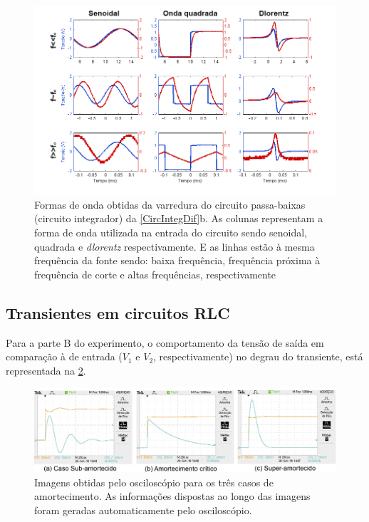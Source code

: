 \documentclass[11pt,a4paper]{article}
\begin{document}
    
        \begin{figure}[!htb]
        \centering
        \includegraphics[scale=0.8]{PassaBaixaVarredura.png}
        \caption{Formas de onda obtidas da varredura do circuito passa-baixas (circuito integrador) da \cref{CircIntegDif}b. As colunas representam a forma de onda utilizada na entrada do circuito sendo senoidal, quadrada e \textit{dlorentz} respectivamente. E as linhas estão à mesma frequência da fonte sendo: baixa frequência, frequência próxima à frequência de corte e altas frequências, respectivamente}
        \label{PassaBaixaVarredura}
        \end{figure}
        
    \newpage
    \subsection{Transientes em circuitos RLC}
    Para a parte B do experimento, o comportamento da tensão de saída em comparação à de entrada ($V_1$ e $V_2$, respectivamente) no degrau do transiente, está representada na \cref{TransOscilo}.
    
        \begin{figure}[!htb]
        \centering
        \includegraphics[scale=0.55]{TransienteOsciloscopio.png}
        \caption{Imagens obtidas pelo osciloscópio para os três casos de amortecimento. As informações dispostas ao longo das imagens foram geradas automaticamente pelo osciloscópio.}
        \label{TransOscilo}
        \end{figure}
        
\end{document}
